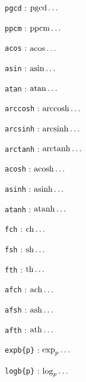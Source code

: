 \documentclass[12pt,a4paper]{article}
\begin{document}
\begin{multicols}{2}
\verb+pgcd+ : $\pgcd\dots$

\verb+ppcm+ : $\ppcm\dots$

\verb+acos+ : $\acos\dots$

\verb+asin+ : $\asin\dots$

\verb+atan+ : $\atan\dots$

\verb+arccosh+ : $\arccosh\dots$

\verb+arcsinh+ : $\arcsinh\dots$

\verb+arctanh+ : $\arctanh\dots$

\verb+acosh+ : $\acosh\dots$

\verb+asinh+ : $\asinh\dots$

\verb+atanh+ : $\atanh\dots$

\verb+fch+ : $\fch\dots$

\verb+fsh+ : $\fsh\dots$

\verb+fth+ : $\fth\dots$

\verb+afch+ : $\afch\dots$

\verb+afsh+ : $\afsh\dots$

\verb+afth+ : $\afth\dots$

\verb+expb{p}+ : $\expb{p}\dots$

\verb+logb{p}+ : $\logb{p}\dots$
\end{multicols}
\end{document}
